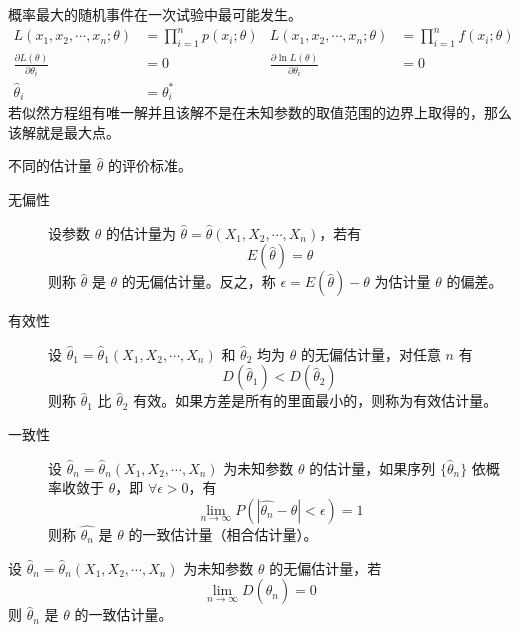 \documentclass{ctexbook}
\begin{document}
\begin{definition}[最大似然估计]
    概率最大的随机事件在一次试验中最可能发生。
    \begin{align}
        L(x_1,x_2,\cdots,x_n;\theta)&=\prod_{i=1}^n p(x_i;\theta) & L(x_1,x_2,\cdots,x_n;\theta) &= \prod_{i=1}^n f(x_i;\theta)\\
        \frac{\partial L(\theta)}{\partial \theta_i}&=0 & \frac{\partial \ln L(\theta)}{\partial \theta_i}&=0\\
        \hat{\theta}_i&=\theta_i^*
    \end{align}
    若似然方程组有唯一解并且该解不是在未知参数的取值范围的边界上取得的，那么该解就是最大点。
\end{definition}

\begin{definition}[估计量的评价标准]
    不同的估计量 $\hat{\theta}$ 的评价标准。
    \begin{description}
        \item[无偏性] 设参数 $\theta$ 的估计量为 $\hat{\theta}=\hat{\theta}(X_1,X_2,\cdots,X_n)$，若有
        \begin{equation}
            E(\hat{\theta})=\theta
        \end{equation}
        则称 $\hat{\theta}$ 是 $\theta$ 的无偏估计量。反之，称 $\epsilon=E(\hat{\theta})-\theta$ 为估计量 $\theta$ 的偏差。
        \item[有效性] 设 $\hat{\theta}_1=\hat{\theta}_1(X_1,X_2,\cdots,X_n)$ 和 $\hat{\theta}_2$ 均为 $\theta$ 的无偏估计量，对任意 $n$ 有
        \begin{equation}
            D(\hat{\theta}_1)<D(\hat{\theta}_2)
        \end{equation}
        则称 $\hat{\theta}_1$ 比 $\hat{\theta}_2$ 有效。如果方差是所有的里面最小的，则称为有效估计量。
        \item[一致性] 设 $\hat{\theta}_n=\hat{\theta}_n(X_1,X_2,\cdots,X_n)$ 为未知参数 $\theta$ 的估计量，如果序列 $\{\hat{\theta}_n\}$ 依概率收敛于 $\theta$，即 $\forall\epsilon>0$，有
        \begin{equation}
            \lim_{n\rightarrow\infty} P(|\hat{\theta_n}-\theta|<\epsilon)=1
        \end{equation}
        则称 $\hat{\theta_n}$ 是 $\theta$ 的一致估计量（相合估计量）。
    \end{description}
\end{definition}

\begin{theorem}[一致估计量判别法]
    设 $\hat{\theta}_n=\hat{\theta}_n(X_1,X_2,\cdots,X_n)$ 为未知参数 $\theta$ 的无偏估计量，若
    \begin{equation}
        \lim_{n\rightarrow\infty}D(\hat{\theta}_n)=0
    \end{equation}
    则 $\hat{\theta}_n$ 是 $\theta$ 的一致估计量。
\end{theorem}
\end{document}
